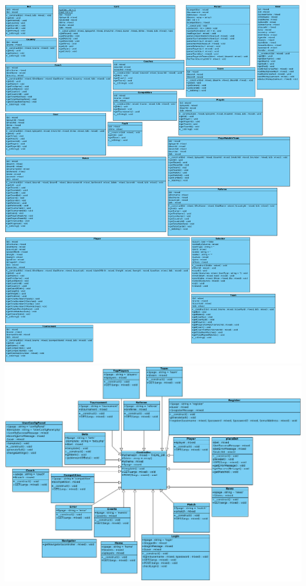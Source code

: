 \documentclass[11pt]{article}
\begin{document}
\includegraphics[scale=0.25]{UML_Classes.png}
\clearpage
\includegraphics[scale=0.32]{UML_Controller.png}
\clearpage
\end{document}
